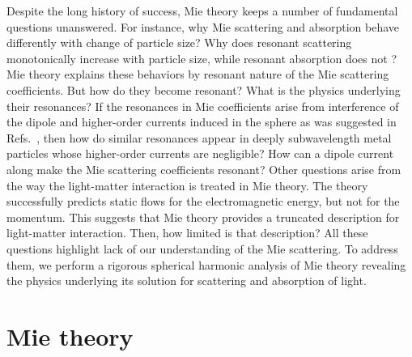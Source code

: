 \documentclass[aps,prb,reprint]{revtex4-2}
\begin{document}
Despite the long history of success, Mie theory keeps a number of fundamental questions unanswered. 
For instance, why Mie scattering and absorption behave differently with change of particle size? 
Why does resonant scattering monotonically increase with particle size, while resonant absorption does not \cite{Akimov:2009}? 
Mie theory explains these behaviors by resonant nature of the Mie scattering coefficients. 
But how do they become resonant? 
What is the physics underlying their resonances? 
If the resonances in Mie coefficients arise from interference of the dipole and higher-order currents induced in the sphere as was suggested in Refs.~\cite{Grahn:2012,Miroshnichenko:2015,Luk'yanchuk:2017}, then how do similar resonances appear in deeply subwavelength metal particles \cite{Akimov:2012,Kolwas:2013} whose higher-order currents are negligible? 
How can a dipole current along make the Mie scattering coefficients resonant? 
Other questions arise from the way the light-matter interaction is treated in Mie theory. 
The theory successfully predicts static flows for the electromagnetic energy, but not for the momentum. 
This suggests that Mie theory provides a truncated description for light-matter interaction. 
Then, how limited is that description? 
All these questions highlight lack of our understanding of the Mie scattering.
To address them, we perform a rigorous spherical harmonic analysis of Mie theory revealing the physics underlying its solution for scattering and absorption of light.      
 

\section{Mie theory}
\end{document}
